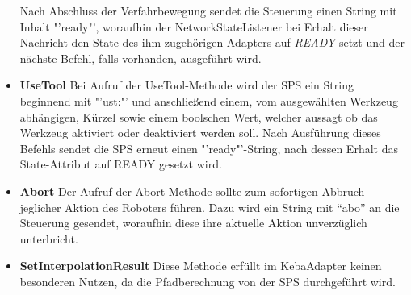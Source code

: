 \begin{itemize}
Nach Abschluss der Verfahrbewegung sendet die Steuerung einen String mit Inhalt "'ready"', woraufhin der NetworkStateListener bei Erhalt dieser Nachricht den State des ihm zugehörigen Adapters auf \textit{READY} setzt und der nächste Befehl, falls vorhanden, ausgeführt wird.
\item \textbf{UseTool}
\newline
Bei Aufruf der UseTool-Methode wird der SPS ein String beginnend mit "'ust:"' und anschließend einem, vom ausgewählten Werkzeug abhängigen, Kürzel sowie einem boolschen Wert, welcher aussagt ob das Werkzeug aktiviert oder deaktiviert werden soll. Nach Ausführung dieses Befehls sendet die SPS erneut einen "'ready"'-String, nach dessen Erhalt das State-Attribut auf READY gesetzt wird. 
\item \textbf{Abort}
\newline
Der Aufruf der Abort-Methode sollte zum sofortigen Abbruch jeglicher Aktion des Roboters führen. Dazu wird ein String mit “abo” an die Steuerung gesendet, woraufhin diese ihre aktuelle Aktion unverzüglich unterbricht. 
\item \textbf{SetInterpolationResult}
\newline
Diese Methode erfüllt im KebaAdapter keinen besonderen Nutzen, da die Pfadberechnung von der SPS durchgeführt wird.
\end{itemize}
